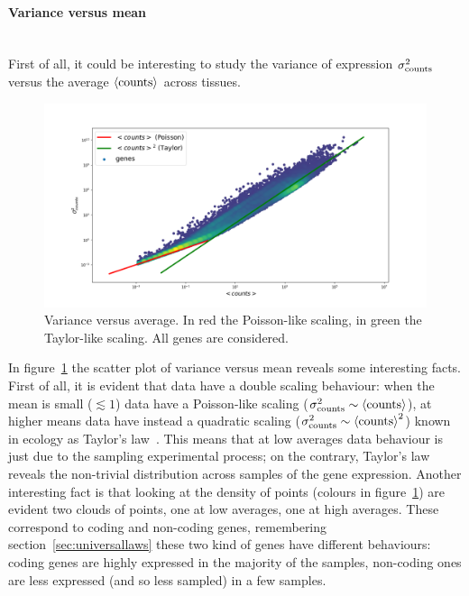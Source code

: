 \paragraph{Variance versus mean}\mbox{}\\
First of all, it could be interesting to study the variance of expression $\sigma^2_{\mathrm{counts}}$ versus 
the average $\left\langle \mathrm{counts}\right\rangle$ across tissues.
\begin{figure}[htb!]
    \centering
    \includegraphics[width=0.9\linewidth]{pictures/scalinglaws/gtex/allgenes/varmean_loglog.png}
    \caption{Variance versus average. In \textcolor{pythonred}{red} the Poisson-like scaling, in \textcolor{pythongreen}{green} the Taylor-like scaling. All genes are considered.}
    \label{fig:scalinglaws/gtex/allgenes/varmean_loglog_density}
\end{figure}
In figure~\ref{fig:scalinglaws/gtex/allgenes/varmean_loglog_density} the scatter plot of variance versus mean reveals some interesting facts.
First of all, it is evident that data have a double scaling behaviour: when the mean is small ($\lesssim 1$) data have a Poisson-like scaling ($\sigma^2_{\mathrm{counts}} \sim \left\langle \mathrm{counts}\right\rangle$), at higher means data have instead a quadratic scaling ($\sigma^2_{\mathrm{counts}} \sim \left\langle \mathrm{counts}\right\rangle^2$) known in ecology as Taylor's law~\cite{Eisler2008}. This means that at low averages data behaviour is just due to the sampling experimental process; on the contrary, Taylor's law reveals the non-trivial distribution across samples of the gene expression.
Another interesting fact is that looking at the density of points (colours in figure~\ref{fig:scalinglaws/gtex/allgenes/varmean_loglog_density}) are evident two clouds of points, one at low averages, one at high averages. These correspond to coding and non-coding genes, remembering section~\ref{sec:universallaws} these two kind of genes have different behaviours: coding genes are highly expressed in the majority of the samples, non-coding ones are less expressed (and so less sampled) in a few samples. 

